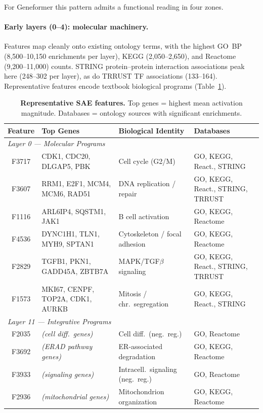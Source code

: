\documentclass[onecolumn,11pt]{article}
\begin{document}
For Geneformer this pattern admits a functional reading in four zones.

\paragraph{Early layers (0--4): molecular machinery.} Features map cleanly onto existing ontology
terms, with the highest GO~BP (8,500--10,150 enrichments per layer), KEGG (2,050--2,650), and
Reactome (9,200--11,000) counts. STRING protein--protein interaction associations peak here
(248--302 per layer), as do TRRUST TF associations (133--164). Representative features encode
textbook biological programs (Table~\ref{tab:examples}).

\begin{table}[t]
\centering
\caption{\textbf{Representative SAE features.} Top genes = highest mean activation magnitude. Databases = ontology sources with significant enrichments.}
\label{tab:examples}
\smallskip
\small
\begin{tabular}{cp{3.8cm}p{3.5cm}l}
\toprule
Feature & Top Genes & Biological Identity & Databases \\
\midrule
\multicolumn{4}{l}{\textit{Layer 0 --- Molecular Programs}} \\
F3717 & CDK1, CDC20, DLGAP5, PBK & Cell cycle (G2/M) & GO, KEGG, React., STRING \\
F3607 & RRM1, E2F1, MCM4, MCM6, RAD51 & DNA replication / repair & GO, KEGG, React., STRING, TRRUST \\
F1116 & ARL6IP4, SQSTM1, JAK1 & B cell activation & GO, KEGG, Reactome \\
F4536 & DYNC1H1, TLN1, MYH9, SPTAN1 & Cytoskeleton / focal adhesion & GO, KEGG, Reactome \\
F2829 & TGFB1, PKN1, GADD45A, ZBTB7A & MAPK/TGF$\beta$ signaling & GO, KEGG, React., STRING, TRRUST \\
F1573 & MKI67, CENPF, TOP2A, CDK1, AURKB & Mitosis / chr.\ segregation & GO, KEGG, React., STRING \\
\midrule
\multicolumn{4}{l}{\textit{Layer 11 --- Integrative Programs}} \\
F2035 & \textit{(cell diff.\ genes)} & Cell diff.\ (neg.\ reg.) & GO, Reactome \\
F3692 & \textit{(ERAD pathway genes)} & ER-associated degradation & GO, KEGG, Reactome \\
F3933 & \textit{(signaling genes)} & Intracell.\ signaling (neg.\ reg.) & GO, Reactome \\
F2936 & \textit{(mitochondrial genes)} & Mitochondrion organization & GO, KEGG, Reactome \\
\bottomrule
\end{tabular}
\end{table}
\end{document}
